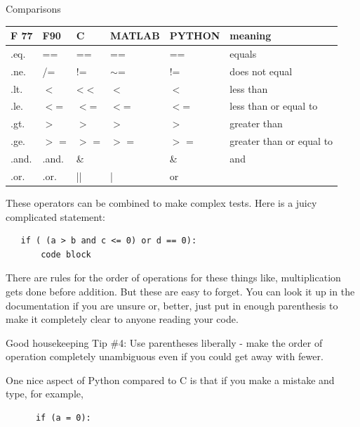 \documentclass[11pt]{book}
\begin{document}
{{{\centerline{Comparisons}
\begin{tabular}{llllll}
\hline
F 77  \qquad &   F90    \qquad &  C    \qquad & MATLAB  \qquad & PYTHON  \qquad & meaning\\
\hline
.eq.  \qquad &  ==   \qquad &   ==    \qquad &  ==  \qquad &     ==   \qquad &  equals\\
.ne. \qquad &   /=  \qquad &    !=   \qquad &   $\sim$=    \qquad &   !=  \qquad &   does not equal\\
.lt.  \qquad &  $<$   \qquad &    <$<$  \qquad &     $<$  \qquad &   $<$  \qquad &    less than\\
.le.  \qquad &  $<$= \qquad &     $<$=   \qquad &  $<$=   \qquad &    $<$=  \qquad &   less than or equal to\\
.gt.  \qquad & $>$ \qquad &      $>$    \qquad &   $>$    \qquad & $>$   \qquad &    greater than\\
.ge.  \qquad &  $>$ =   \qquad &   $>$ =   \qquad &  $>$ =  \qquad &    $>$ =  \qquad &   greater than or equal to\\
.and. \qquad & .and. \qquad &   \&\qquad &    \qquad &  \&  \qquad &      and\\
.or.  \qquad & .or.  \qquad &    ||    \qquad &  |   \qquad &     or \\ 
\hline
\end{tabular}


These operators can be combined to make complex tests.  Here is a juicy complicated statement:

{ \color{blue} \begin{verbatim}
   if ( (a > b and c <= 0) or d == 0):
       code block
   \end{verbatim}}
\noindent   
There are rules for the order of operations for these things like, multiplication gets done before addition.   But these are easy to forget.  You can look it up in the documentation if 
you are unsure or, better, just put in enough parenthesis to 
make it completely clear to anyone reading your code.

\noindent
{\color{magenta}Good housekeeping Tip \#4: Use parentheses liberally - make the order of operation completely unambiguous even if you could get away with fewer. }
  
  
One nice aspect of Python compared to C is that if you make
a mistake and type, for example,

{\color{blue}   \begin{verbatim}
      if (a = 0):
         \end{verbatim}}

}}}
\end{document}
